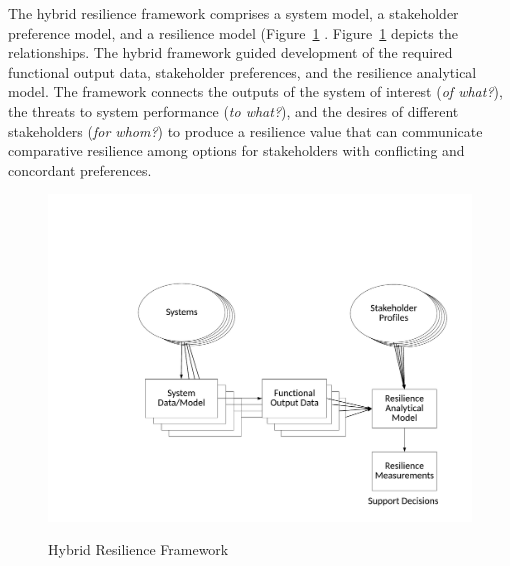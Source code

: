 \documentclass[preprint,12pt]{elsarticle}
\begin{document}
The hybrid resilience framework
comprises a system model, a stakeholder preference model, and a resilience
model (Figure~\ref{f:ClassIIIRes} \citet{Emanuel2018,Shanthikumar1983}. Figure~\ref{f:ClassIIIRes} depicts the
relationships. The hybrid framework guided
development of the required functional output data, stakeholder
preferences, and the resilience analytical model. The framework connects  the
outputs of the system of interest (\emph{of what?}), the threats to system
performance (\emph{to what?}),
and the desires of different stakeholders (\emph{for whom?}) to produce a resilience
value that can communicate comparative resilience among options for
 stakeholders with conflicting and concordant preferences.

\begin{figure}
\begin{center}
\includegraphics[width=5in]{ClassIIIRes}
\end{center}
\renewcommand{\baselinestretch}{1}
\small\normalsize
\begin{quote}
\caption{Hybrid Resilience Framework}
\label{f:ClassIIIRes}
\end{quote}
\end{figure}
\end{document}
